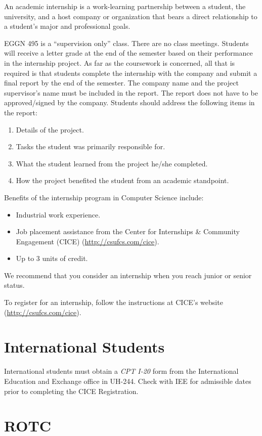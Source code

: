 \documentclass{book}
\newcommand{\shrunkurl}[1]{\url{http://csufcs.com/#1}}
\begin{document}
An academic internship is a work-learning partnership between a
student, the university, and a host company or organization that bears
a direct relationship to a student’s major and professional goals.

EGGN 495 is a ``supervision only'' class. There are no class
meetings. Students will receive a letter grade at the end of the
semester based on their performance in the internship project. As far
as the coursework is concerned, all that is required is that students
complete the internship with the company and submit a final report by
the end of the semester. The company name and the project supervisor's
name must be included in the report. The report does not have to be
approved/signed by the company. Students should address the following
items in the report:
\begin{enumerate}
\item Details of the project.
\item Tasks the student was primarily responsible for.
\item What the student learned from the project he/she completed.
\item How the project benefited the student from an academic standpoint.
\end{enumerate}

Benefits of the internship program in Computer Science include:
\begin{itemize}
\item Industrial work experience.
\item Job placement assistance from the Center for Internships \& Community Engagement (CICE) (\shrunkurl{cice}).
\item Up to 3 units of credit.
\end{itemize}

We recommend that you consider an internship when you reach junior or senior status.

To register for an internship, follow the instructions at CICE's website (\shrunkurl{cice}).

\section{International Students}

International students must obtain a \emph{CPT I-20} form from the
International Education and Exchange office in UH-244. Check with IEE
for admissible dates prior to completing the CICE Registration.

\section{ROTC}
\end{document}
